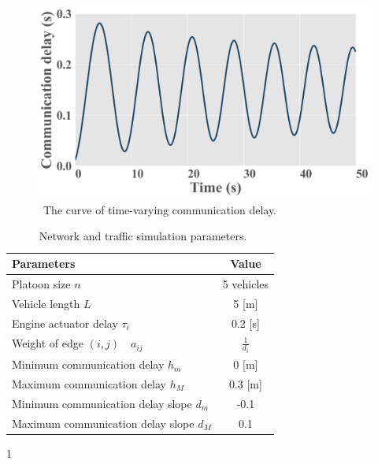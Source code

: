 \documentclass[a4paper]{cas-sc}
\begin{document}
\begin{figure}
  \centering

  \includegraphics[width=12cm]{figs/fig2.png}
  \caption{~The curve of time-varying communication delay.}
  \label{fig2}
\end{figure}

\begin{table}
  \centering
  \setlength{\abovecaptionskip}{0pt}
  \setlength{\belowcaptionskip}{10pt}%
  \begin{threeparttable}[b]

    \caption{~Network and traffic simulation parameters.}
    \label{table1}
    {\begin{tabular}{lc} \toprule
        Parameters                                         & Value               \\ \midrule
        Platoon size $n$                                   & 5 vehicles          \\
        Vehicle length $L$                                 & 5 [m]               \\
        Engine actuator delay $\tau_i$                     & 0.2 [s] \tnote{1}   \\
        Weight of edge $\left( {i,j} \right) \quad a_{ij}$ & $\frac{1}{{{d_i}}}$ \\
        Minimum communication delay $h_{m}$                & 0 [m]               \\
        Maximum communication delay $h_{M}$                & 0.3 [m]             \\
        Minimum communication delay slope $d_{m}$          & -0.1                \\
        Maximum communication delay slope $d_{M}$          & 0.1                 \\
        \bottomrule
      \end{tabular}}
    \begin{tablenotes}
      \item[1] \citep{Wang2018a,Zhou2020}
    \end{tablenotes}
  \end{threeparttable}
\end{table}
\end{document}
